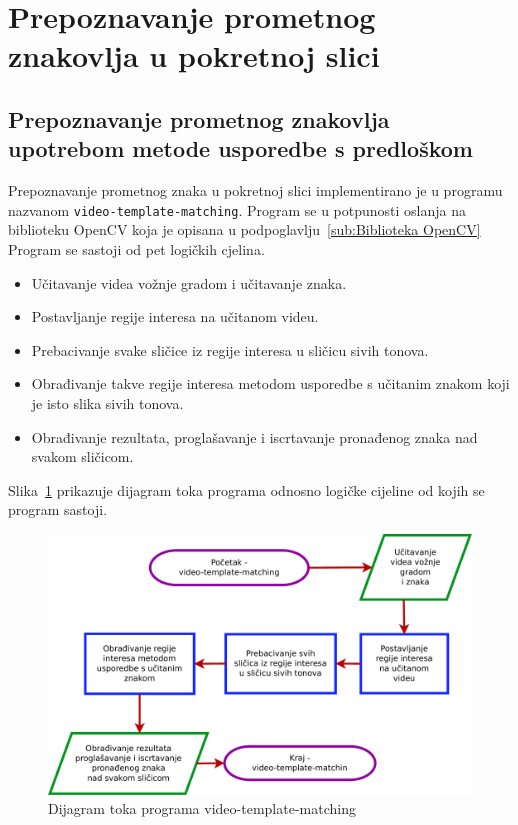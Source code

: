\newpage
\setcounter{figure}{0}

\section{Prepoznavanje prometnog znakovlja u pokretnoj slici} %
\label{sec:Prepoznavanje prometnog}

\subsection{Prepoznavanje prometnog znakovlja upotrebom metode usporedbe
s predloškom} %
\label{sub:Prepoznavanje prometnog znakovlja upotrebom metode uspore}

Prepoznavanje prometnog znaka u pokretnoj slici implementirano je u
programu nazvanom \texttt{video-template-matching}. Program se u
potpunosti oslanja na biblioteku OpenCV koja je opisana u
podpoglavlju~\ref{sub:Biblioteka OpenCV} Program se sastoji od pet
logičkih cjelina.

\begin{itemize}
    \item Učitavanje videa vožnje gradom i učitavanje znaka.
    \item Postavljanje regije interesa na učitanom videu.
    \item Prebacivanje svake sličice iz regije interesa u sličicu sivih
        tonova. 
    \item Obrađivanje takve regije interesa metodom usporedbe s učitanim
        znakom koji je isto slika sivih tonova.
    \item Obrađivanje rezultata, proglašavanje i iscrtavanje pronađenog
        znaka nad svakom sličicom.
\end{itemize}

Slika~\ref{fig:dijagramtoka.pdf} prikazuje dijagram toka programa
odnosno logičke cijeline od kojih se program sastoji.

\begin{figure}[h]
\centering
\includegraphics[scale=0.4]{figures/dijagramtoka.pdf}
\caption{Dijagram toka programa video-template-matching}
\label{fig:dijagramtoka.pdf}
\end{figure}



